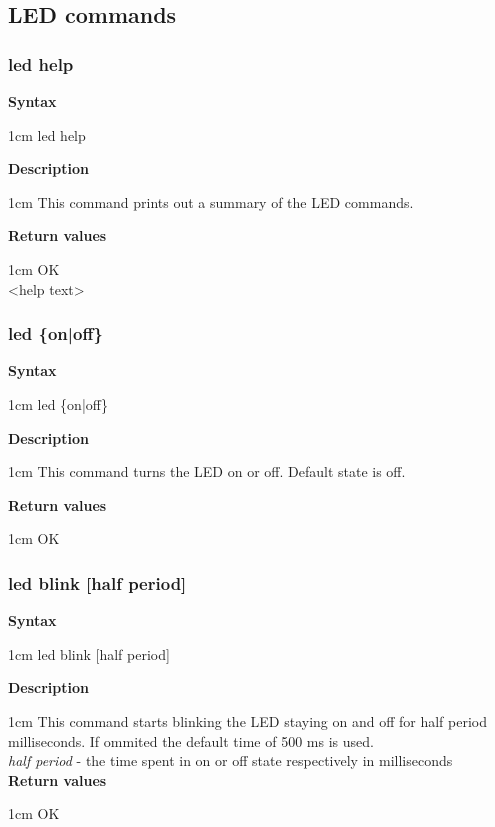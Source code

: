 \documentclass{article}[a4paper]
\begin{document}
\subsection{LED commands}
\subsubsection{led help}
\begin{tcolorbox}
	{\bf Syntax}

	 1cm \dimexpr\linewidth-2cm\relax
	led help

	\medskip
	{\bf Description}

	 1cm \dimexpr\linewidth-2cm\relax
	This command prints out a summary of the LED commands.

	\medskip
	{\bf Return values}

	 1cm \dimexpr\linewidth-2cm\relax
	OK \\
	<help text>
\end{tcolorbox}

\subsubsection{led \{on|off\}}
\begin{tcolorbox}
	{\bf Syntax}

	 1cm \dimexpr\linewidth-2cm\relax
	led \{on|off\}

	\medskip
	{\bf Description}

	 1cm \dimexpr\linewidth-2cm\relax
	This command turns the LED on or off.
	Default state is off.

	\medskip
	{\bf Return values}

	 1cm \dimexpr\linewidth-2cm\relax
	OK
\end{tcolorbox}

\subsubsection{led blink [half period]}
\begin{tcolorbox}
	{\bf Syntax}

	 1cm \dimexpr\linewidth-2cm\relax
	led blink [half period]

	\medskip
	{\bf Description}

	 1cm \dimexpr\linewidth-2cm\relax
	This command starts blinking the LED staying on and off for half period
	milliseconds. If ommited the default time of 500 ms is used.
	\medskip \\
	{\it half period} - the time spent in on or off state respectively in milliseconds \\

	\medskip
	{\bf Return values}

	 1cm \dimexpr\linewidth-2cm\relax
	OK
\end{tcolorbox}
\end{document}
